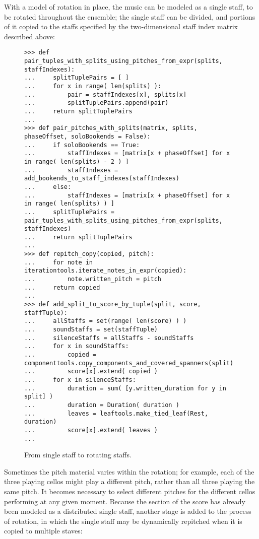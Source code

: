 With a model of rotation in place, the music can be modeled as a single staff, to be rotated throughout the ensemble; the single staff can be divided, and portions of it copied to the staffs specified by the two-dimensional staff index matrix described above:

\begin{figure}[H]
\begin{lstlisting}[basicstyle=\scriptsize\ttfamily, breaklines=True, tabsize=4, showtabs=false, showspaces=false]
>>> def pair_tuples_with_splits_using_pitches_from_expr(splits, staffIndexes):
...     splitTuplePairs = [ ]
...     for x in range( len(splits) ):
...         pair = staffIndexes[x], splits[x]
...         splitTuplePairs.append(pair)
...     return splitTuplePairs
... 
>>> def pair_pitches_with_splits(matrix, splits, phaseOffset, soloBookends = False):
...     if soloBookends == True:
...         staffIndexes = [matrix[x + phaseOffset] for x in range( len(splits) - 2 ) ]
...         staffIndexes = add_bookends_to_staff_indexes(staffIndexes)
...     else:
...         staffIndexes = [matrix[x + phaseOffset] for x in range( len(splits) ) ]
...     splitTuplePairs = pair_tuples_with_splits_using_pitches_from_expr(splits, staffIndexes)
...     return splitTuplePairs
... 
>>> def repitch_copy(copied, pitch):
...     for note in iterationtools.iterate_notes_in_expr(copied):
...         note.written_pitch = pitch
...     return copied
... 
>>> def add_split_to_score_by_tuple(split, score, staffTuple):
...     allStaffs = set(range( len(score) ) )
...     soundStaffs = set(staffTuple)
...     silenceStaffs = allStaffs - soundStaffs
...     for x in soundStaffs:
...         copied = componenttools.copy_components_and_covered_spanners(split)
...         score[x].extend( copied )
...     for x in silenceStaffs:
...         duration = sum( [y.written_duration for y in split] ) 
...         duration = Duration( duration )
...         leaves = leaftools.make_tied_leaf(Rest, duration)
...         score[x].extend( leaves )
... \end{lstlisting}

\caption{From single staff to rotating staffs. } 
\end{figure}

Sometimes the pitch material varies within the rotation; for example, each of the three playing cellos might play a different pitch, rather than all three playing the same pitch. It becomes necessary to select different pitches for the different cellos performing at any given moment. Because the section of the score has already been modeled as a distributed single staff, another stage is added to the process of rotation, in which the single staff may be dynamically repitched when it is copied to multiple staves:

